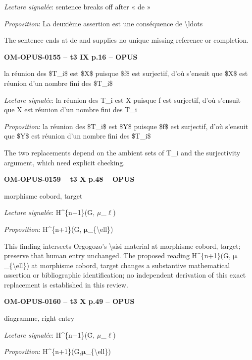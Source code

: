 \emph{Lecture signalée}: sentence breaks off after « de »\par
\emph{Proposition}: La deuxième assertion est une conséquence de \textbackslash{}ldots\par
The sentence ends at de and supplies no unique missing reference or completion.\par
\par\noindent\textbf{OM-OPUS-0155 -- t3 IX p.16 -- OPUS}\par
la réunion des \$T\_i\$ est \$X\$ puisque \$f\$ est surjectif, d'où s'ensuit que \$X\$ est réunion d'un nombre fini des \$T\_i\$\par
\emph{Lecture signalée}: la réunion des T\_i est X puisque f est surjectif, d'où s'ensuit que X est réunion d'un nombre fini des T\_i\par
\emph{Proposition}: la réunion des \$T\_i\$ est \$Y\$ puisque \$f\$ est surjectif, d'où s'ensuit que \$Y\$ est réunion d'un nombre fini des \$T\_i\$\par
The two replacements depend on the ambient sets of T\_i and the surjectivity argument, which need explicit checking.\par
\par\noindent\textbf{OM-OPUS-0159 -- t3 X p.48 -- OPUS}\par
morphisme cobord, target\par
\emph{Lecture signalée}: H\textasciicircum{}\{n+1\}(Ḡ, \ensuremath{\mu}\_\ensuremath{\ell})\par
\emph{Proposition}: H\textasciicircum{}\{n+1\}(G, \ensuremath{𝛍}\_\{\textbackslash{}ell\})\par
This finding intersects Orgogozo's \textbackslash{}sisi material at morphisme cobord, target; preserve that human entry unchanged. The proposed reading H\textasciicircum{}\{n+1\}(G, \ensuremath{𝛍}\_\{\textbackslash{}ell\}) at morphisme cobord, target changes a substantive mathematical assertion or bibliographic identification; no independent derivation of this exact replacement is established in this review.\par
\par\noindent\textbf{OM-OPUS-0160 -- t3 X p.49 -- OPUS}\par
diagramme, right entry\par
\emph{Lecture signalée}: H\textasciicircum{}\{n+1\}(Ḡ, \ensuremath{\mu}\_\ensuremath{\ell})\par
\emph{Proposition}: H\textasciicircum{}\{n+1\}(G,\ensuremath{𝛍}\_\{\textbackslash{}ell\})\par
